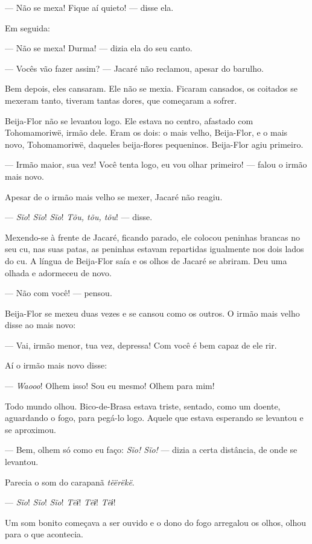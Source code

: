--- Não se mexa! Fique aí quieto! --- disse ela.

Em seguida:

--- Não se mexa! Durma! --- dizia ela do seu canto.

--- Vocês vão fazer assim? --- Jacaré não reclamou, apesar do barulho. 

Bem depois, eles cansaram. Ele não se mexia. Ficaram cansados, os
coitados se mexeram tanto, tiveram tantas dores, que começaram a
sofrer. 

Beija-Flor não se levantou logo. Ele estava no centro, afastado com
Tohomamoriwë, irmão dele. Eram os dois: o mais velho, Beija-Flor, e o
mais novo, Tohomamoriwë, daqueles beija-flores pequeninos. Beija-Flor
agiu primeiro. 

--- Irmão maior, sua vez! Você tenta logo, eu vou olhar primeiro! ---
falou o irmão mais novo. 

Apesar de o irmão mais velho se mexer, Jacaré não reagiu.

--- \textit{Sĩo}! \textit{Sĩo}! \textit{Sĩo}! \textit{Tõu, tõu, tõu}! --- disse.

Mexendo-se à frente de Jacaré, ficando parado, ele colocou peninhas
 brancas no seu cu, nas suas patas, as peninhas estavam repartidas
 igualmente nos dois lados do cu. A língua de Beija-Flor saía e os
 olhos de Jacaré se abriram. Deu uma olhada e adormeceu de novo. 

--- Não com você! --- pensou. 

Beija-Flor se mexeu duas vezes e se cansou como os outros.
O irmão mais velho disse ao mais novo: 

--- Vai, irmão menor, tua vez, depressa! Com você é bem capaz de ele
rir.

Aí o irmão mais novo disse:

--- \textit{Waooo}! Olhem isso! Sou eu mesmo! Olhem para mim! 

Todo mundo olhou. Bico-de-Brasa estava triste, sentado, como um
doente, aguardando o fogo, para pegá-lo logo. Aquele que estava esperando
se levantou e se aproximou. 

--- Bem, olhem só como eu faço: \textit{Sĩo! Sĩo!} --- dizia a certa
distância, de onde se levantou. 

Parecia o som do carapanã \textit{tëërëkë}.

--- \textit{Sĩo}! \textit{Sĩo}! \textit{Sĩo}! \textit{Tëɨ}! \textit{Tëɨ}! \textit{Tëɨ}!

Um som bonito começava a ser ouvido e o dono do fogo arregalou os olhos,
olhou para o que acontecia.


